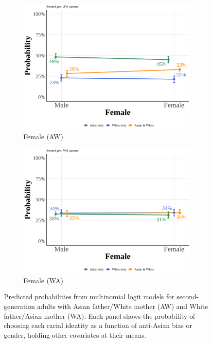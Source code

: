 \begin{center}
\begin{figure}[!htb]
\vspace{0.5cm}

\begin{subfigure}{.48\textwidth}
\caption{Female (AW)}
\centering
\includegraphics[width=1\linewidth]{pp_second_aw_Female_simple.png}
\end{subfigure}
\hfill
\begin{subfigure}{.48\textwidth}
\caption{Female (WA)}
\centering
\includegraphics[width=1\linewidth]{pp_second_wa_Female_simple.png}
\end{subfigure}

\caption*{\footnotesize{Predicted probabilities from multinomial logit models for second-generation adults with Asian father/White mother (AW) and White father/Asian mother (WA). Each panel shows the probability of choosing each racial identity as a function of anti-Asian bias or gender, holding other covariates at their means.}}
\end{figure}
\end{center}

